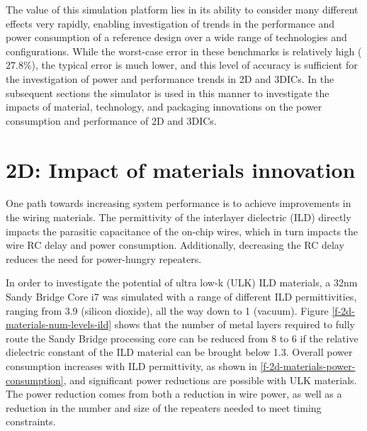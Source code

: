 \documentclass[journal,twoside]{IEEEtran}
\newcommand{\changed}[1]{\textcolor{red}{#1}}
\newcommand{\rechanged}[1]{\textcolor{red}{#1}}
\renewcommand{\rechanged}[1]{#1} %
\renewcommand{\changed}[1]{#1} %
\begin{document}

\rechanged{
The value of this simulation platform lies
in its ability to consider many different effects very rapidly,
enabling investigation of trends in the performance and power consumption of a reference design
over a wide range of technologies and configurations.
While the worst-case error in these benchmarks is relatively high ($27.8\%$), 
the typical error is much lower, and this level of accuracy is sufficient for the investigation
of power and performance trends in 2D and 3DICs.
In the subsequent sections the simulator is used in this manner
to investigate the impacts of material, technology, and packaging innovations on the power consumption
and performance of 2D and 3DICs.}

\section{2D: Impact of materials innovation} \label{s-2d-investigations}
One path towards increasing system performance is to achieve improvements in the wiring materials.
The permittivity of the interlayer dielectric (ILD) directly impacts the parasitic
capacitance of the on-chip wires,
which in turn impacts the wire RC delay and power consumption. Additionally, decreasing the RC delay
reduces the need for power-hungry repeaters.

In order to investigate the potential of ultra low-k (ULK) ILD materials, 
a 32nm Sandy Bridge Core i7 was simulated with a range of different
ILD permittivities, ranging from 3.9 (silicon dioxide), all the way down to 1 (vacuum).
Figure \ref{f-2d-materials-num-levels-ild} shows that the number of metal layers required to fully route
the Sandy Bridge processing core can be reduced from 8 to 6 if the relative dielectric constant
of the ILD material can be brought below 1.3.
\rechanged{Overall power consumption increases with}
ILD permittivity, as shown in \cref{f-2d-materials-power-consumption}, and significant power reductions
are possible with ULK materials. The power reduction comes from both a reduction in wire power,
as well as a reduction in the number and size of the repeaters needed to meet timing constraints.
\end{document}

